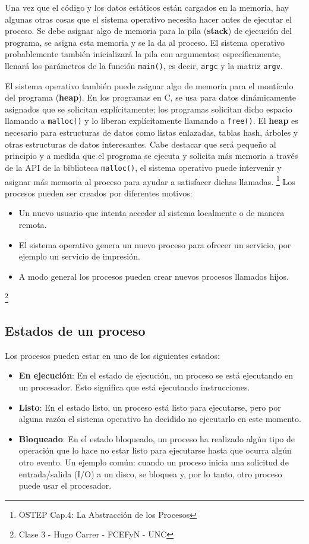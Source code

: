 \documentclass{article}
\begin{document}
Una vez que el código y los datos estáticos están cargados en la memoria, hay algunas otras cosas que el sistema operativo necesita hacer antes de ejecutar el proceso. Se debe asignar algo de memoria para la pila (\textbf{stack}) de ejecución del programa, se asigna esta memoria y se la da al proceso. El sistema operativo probablemente también inicializará la pila con argumentos; específicamente, llenará los parámetros de la función \texttt{main()}, es decir, \texttt{argc} y la matriz \texttt{argv}.

El sistema operativo también puede asignar algo de memoria para el montículo del programa (\textbf{heap}). En los programas en C, se usa para datos dinámicamente asignados que se solicitan explícitamente; los programas solicitan dicho espacio llamando a \texttt{malloc()} y lo liberan explícitamente llamando a \texttt{free()}. El \textbf{heap} es necesario para estructuras de datos como listas enlazadas, tablas hash, árboles y otras estructuras de datos interesantes. Cabe destacar que será pequeño al principio y a medida que el programa se ejecuta y solicita más memoria a través de la API de la biblioteca \texttt{malloc()}, el sistema operativo puede intervenir y asignar más memoria al proceso para ayudar a satisfacer dichas llamadas.
\footnote{OSTEP Cap.4: La Abstracción de los Procesos}
Los procesos pueden ser creados por diferentes motivos:
\begin{itemize}
    \item Un nuevo usuario que intenta acceder al sistema localmente o de manera remota.
    \item El sistema operativo genera un nuevo proceso para ofrecer un servicio, por ejemplo un servicio de impresión.
    \item A modo general los procesos pueden crear nuevos procesos llamados hijos.
\end{itemize}

\footnote{Clase 3 - Hugo Carrer - FCEFyN - UNC}

\subsection{Estados de un proceso}
Los procesos pueden estar en uno de los siguientes estados:
\begin{itemize}
    \item \textbf{En ejecución}: En el estado de ejecución, un proceso se está ejecutando en un procesador. Esto significa que está ejecutando instrucciones.
    \item \textbf{Listo}: En el estado listo, un proceso está listo para ejecutarse, pero por alguna razón el sistema operativo ha decidido no ejecutarlo en este momento.
    \item \textbf{Bloqueado}: En el estado bloqueado, un proceso ha realizado algún tipo de operación que lo hace no estar listo para ejecutarse hasta que ocurra algún otro evento. Un ejemplo común: cuando un proceso inicia una solicitud de entrada/salida (I/O) a un disco, se bloquea y, por lo tanto, otro proceso puede usar el procesador.
\end{itemize}
\end{document}
